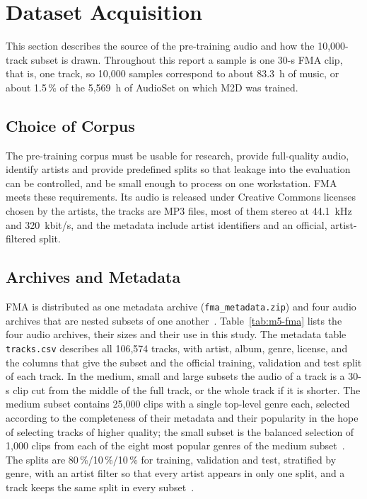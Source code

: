 \documentclass{FastFyp}
\begin{document}
\section{Dataset Acquisition}
\label{sec:m5-acq}
This section describes the source of the pre-training audio and how the 10,000-track subset is drawn. Throughout this report a sample is one 30-s FMA clip, that is, one track, so 10,000 samples correspond to about 83.3~h of music, or about 1.5\,\% of the 5,569~h of AudioSet on which M2D was trained.

\subsection{Choice of Corpus}
The pre-training corpus must be usable for research, provide full-quality audio, identify artists and provide predefined splits so that leakage into the evaluation can be controlled, and be small enough to process on one workstation. FMA~\cite{ref:Defferrard:2017fma} meets these requirements. Its audio is released under Creative Commons licenses chosen by the artists, the tracks are MP3 files, most of them stereo at 44.1~kHz and 320~kbit/s, and the metadata include artist identifiers and an official, artist-filtered split.

\subsection{Archives and Metadata}
FMA is distributed as one metadata archive (\texttt{fma\_metadata.zip}) and four audio archives that are nested subsets of one another~\cite{ref:Defferrard:2017fma,ref:FMAGit}. Table~\ref{tab:m5-fma} lists the four audio archives, their sizes and their use in this study. The metadata table \texttt{tracks.csv} describes all 106,574 tracks, with artist, album, genre, license, and the columns that give the subset and the official training, validation and test split of each track. In the medium, small and large subsets the audio of a track is a 30-s clip cut from the middle of the full track, or the whole track if it is shorter. The medium subset contains 25,000 clips with a single top-level genre each, selected according to the completeness of their metadata and their popularity in the hope of selecting tracks of higher quality; the small subset is the balanced selection of 1,000 clips from each of the eight most popular genres of the medium subset~\cite{ref:Defferrard:2017fma}. The splits are 80\,\%/10\,\%/10\,\% for training, validation and test, stratified by genre, with an artist filter so that every artist appears in only one split, and a track keeps the same split in every subset~\cite{ref:Defferrard:2017fma}.
\end{document}
